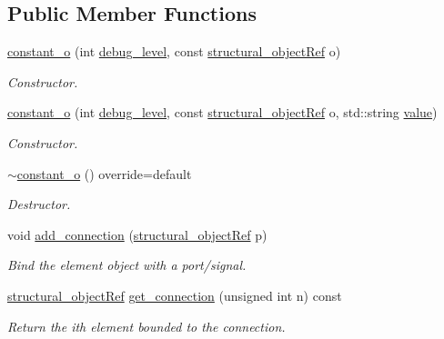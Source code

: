 \subsection*{Public Member Functions}
\begin{DoxyCompactItemize}
\item 
\hyperlink{classconstant__o_a839bd5cc769c8db27f57acd24855821e}{constant\+\_\+o} (int \hyperlink{classstructural__object_ac2744292aa7f0fca3742133d16bb3201}{debug\+\_\+level}, const \hyperlink{structural__objects_8hpp_a8ea5f8cc50ab8f4c31e2751074ff60b2}{structural\+\_\+object\+Ref} o)
\begin{DoxyCompactList}\small\item\em Constructor. \end{DoxyCompactList}\item 
\hyperlink{classconstant__o_addb58fe18b2d23b9b721036414d59034}{constant\+\_\+o} (int \hyperlink{classstructural__object_ac2744292aa7f0fca3742133d16bb3201}{debug\+\_\+level}, const \hyperlink{structural__objects_8hpp_a8ea5f8cc50ab8f4c31e2751074ff60b2}{structural\+\_\+object\+Ref} o, std\+::string \hyperlink{classconstant__o_ab9224c81e6c5783b8db8d68877dc1abe}{value})
\begin{DoxyCompactList}\small\item\em Constructor. \end{DoxyCompactList}\item 
\hyperlink{classconstant__o_a9625c9086f03abc554d21457c35c2938}{$\sim$constant\+\_\+o} () override=default
\begin{DoxyCompactList}\small\item\em Destructor. \end{DoxyCompactList}\item 
void \hyperlink{classconstant__o_aceab3f419906801291e1ccfce63859e5}{add\+\_\+connection} (\hyperlink{structural__objects_8hpp_a8ea5f8cc50ab8f4c31e2751074ff60b2}{structural\+\_\+object\+Ref} p)
\begin{DoxyCompactList}\small\item\em Bind the element object with a port/signal. \end{DoxyCompactList}\item 
\hyperlink{structural__objects_8hpp_a8ea5f8cc50ab8f4c31e2751074ff60b2}{structural\+\_\+object\+Ref} \hyperlink{classconstant__o_a43fed55fb6a6973a531164ab41f1a5c0}{get\+\_\+connection} (unsigned int n) const
\begin{DoxyCompactList}\small\item\em Return the ith element bounded to the connection. \end{DoxyCompactList}\item 

\end{DoxyCompactItemize}
